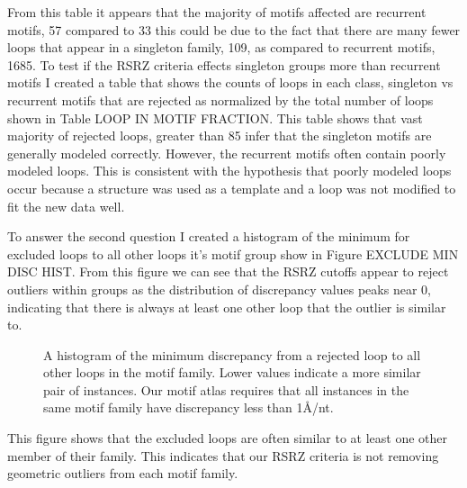From this table it appears that the majority of motifs affected are recurrent
motifs, 57%
compared to 33%
this could be due to the fact that there are many fewer loops that appear in a
singleton family, 109, as compared to recurrent motifs, 1685. To test if the
RSRZ criteria effects singleton groups more than recurrent motifs I created a
table that shows the counts of loops in each class, singleton vs recurrent
motifs that are rejected as normalized by the total number of loops shown in
Table LOOP IN MOTIF FRACTION. This table shows that vast majority of rejected
loops, greater than 85%
infer that the singleton motifs are generally modeled correctly. However, the
recurrent motifs  often contain poorly  modeled loops. This is consistent with
the hypothesis that poorly modeled loops occur because a structure was used as a
template and a loop was not modified to fit the new data well.  

\begin{table}
  \caption{A table showing the counts of rejected loops in each type of motif,
    singleton or recurrent. The percents in the parenthesis indicate the percent
    of rejected loops that occur in each type of motif. Thus the upper row shows
    that there are 419 loops rejected using the RSRZ > 1 cutoff, of those 36 or
    9%
  recurrent motifs. }
\end{table}

To answer the second question I created a histogram of the minimum for excluded
loops to all other loops it’s motif group show in Figure EXCLUDE MIN DISC HIST.
From this figure we can see that the RSRZ cutoffs appear to reject outliers
within groups as the distribution of discrepancy values peaks near 0, indicating
that there is always at least one other loop that the outlier is similar to. 

\begin{figure}
  \caption{A histogram of the minimum discrepancy from a rejected loop to all
    other loops in the motif family. Lower values indicate a more similar pair
    of instances. Our motif atlas requires that all instances in the same motif
  family have discrepancy less than 1Å/nt.}
\end{figure}

This figure shows that the excluded loops are often similar to at least one
other member of their family. This indicates that our RSRZ criteria is not
removing geometric outliers from each motif family. 

